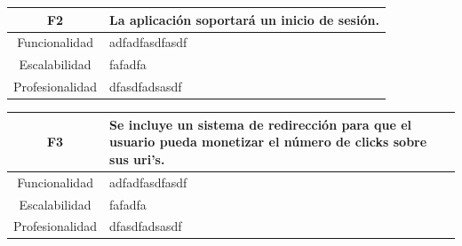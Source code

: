 \documentclass{article}
\begin{document}
\begin{table}[hbtp]
    \footnotesize
    \centering
    \settowidth{}
    \setlength\extrarowheight{5pt}
    \begin{tabulary}{\textwidth}{ C L }
        \textbf{F2} & La aplicación soportará un inicio de sesión.
        \\
    \hline
    
    Funcionalidad & adfadfasdfasdf\\
        
    Escalabilidad & fafadfa \\

    Profesionalidad & dfasdfadsasdf \\

    \end{tabulary}
\end{table}

\begin{table}[hbtp]
    \footnotesize
    \centering
    \settowidth{}
    \setlength\extrarowheight{5pt}
    \begin{tabulary}{\textwidth}{ C L }
        \textbf{F3} & Se incluye un sistema de redirección para que el usuario pueda monetizar el número de clicks sobre sus uri's.
        \\
    \hline
    
    Funcionalidad & adfadfasdfasdf\\
        
    Escalabilidad & fafadfa \\

    Profesionalidad & dfasdfadsasdf \\

    \end{tabulary}
\end{table}
\end{document}
